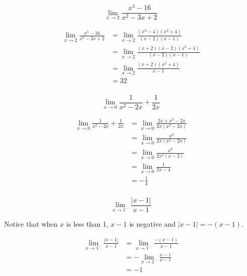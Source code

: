 \documentclass[letterpaper]{exam}
\begin{document}
\begin{questions}
    \question[10]
      \[
        \lim_{x \to 2} \frac{x^4 - 16}{x^2 - 3x + 2}
      \]

      \begin{solution}
        \begin{align*}
          \lim_{x \to 2} \frac{x^4 - 16}{x^2 - 3x + 2} & = \lim_{x \to 2} \frac{\left( x^2 - 4\right) \left( x^2 + 4 \right)}{(x - 2)(x - 1)} \\
                                                       & = \lim_{x \to 2} \frac{(x + 2) (x - 2) \left( x^2 + 4 \right)}{(x - 2)(x - 1)} \\
                                                       & = \lim_{x \to 2} \frac{(x + 2) \left( x^2 + 4 \right)}{x - 1} \\
                                                       & = \boxed{ 32 } \\
        \end{align*}
      \end{solution}

    \question[10]
      \[
        \lim_{x \to 0} \frac{1}{x^2 - 2x} + \frac{1}{2x}
      \]

      \begin{solution}
        \begin{align*}
        \lim_{x \to 0} \frac{1}{x^2 - 2x} + \frac{1}{2x} & = \lim_{x \to 0} \frac{2x + x^2 - 2x}{2x\left( x^2 - 2x \right)} \\
                                                         & = \lim_{x \to 0} \frac{x^2}{2x \left( x^2 - 2x \right)} \\
                                                         & = \lim_{x \to 0} \frac{x^2}{2x^2 (x - 2)} \\
                                                         & = \lim_{x \to 0} \frac{1}{2x - 4} \\
                                                         & = \boxed{ - \frac{1}{4} } \\
        \end{align*}
      \end{solution}


    \question[7]
      \[
        \lim_{x \to 1^-} \frac{|x - 1|}{x - 1}
      \]

      \begin{solution}
        Notice that when $x$ is less than 1, $x - 1$ is negative and $|x - 1| = - (x - 1)$.

        \begin{align*}
          \lim_{x \to 1^-} \frac{|x - 1|}{x - 1} & = \lim_{x \to 1^-} \frac{- (x - 1)}{x - 1} \\
                                                 & = - \lim_{x \to 1^-} \frac{x - 1}{x - 1} \\
                                                 & = \boxed{ -1 } \\
        \end{align*}
      \end{solution}


\end{questions}
\end{document}
